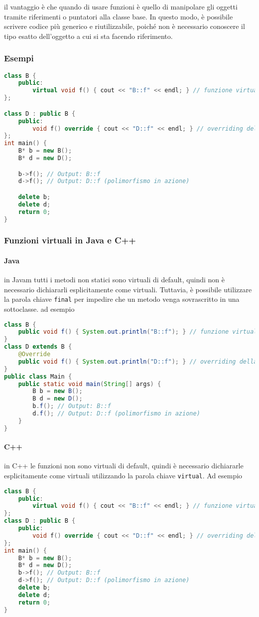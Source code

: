 \documentclass{report}
\begin{document}
il vantaggio è che quando di usare funzioni  è quello di manipolare gli oggetti tramite riferimenti o puntatori alla classe base. In questo modo, è possibile scrivere codice più generico e riutilizzabile, poiché non è necessario conoscere il tipo esatto dell'oggetto a cui si sta facendo riferimento.

\subsubsection{Esempi}

\begin{lstlisting}[language=C++]
class B {
    public:
        virtual void f() { cout << "B::f" << endl; } // funzione virtuale
};

class D : public B {
    public:
        void f() override { cout << "D::f" << endl; } // overriding della funzione virtuale
};
int main() {
    B* b = new B();
    B* d = new D();

    b->f(); // Output: B::f
    d->f(); // Output: D::f (polimorfismo in azione)

    delete b;
    delete d;
    return 0;
}
\end{lstlisting}

\subsubsection{Funzioni virtuali in Java e C++}
\paragraph{Java}
in Javam tutti i metodi non statici sono virtuali di default, quindi non è necessario dichiararli esplicitamente come virtuali. Tuttavia, è possibile utilizzare la parola chiave \texttt{final} per impedire che un metodo venga sovrascritto in una sottoclasse. ad esempio
\begin{lstlisting}[language=Java]
class B {
    public void f() { System.out.println("B::f"); } // funzione virtuale
}
class D extends B {
    @Override
    public void f() { System.out.println("D::f"); } // overriding della funzione virtuale
}
public class Main {
    public static void main(String[] args) {
        B b = new B();
        B d = new D();
        b.f(); // Output: B::f
        d.f(); // Output: D::f (polimorfismo in azione)
    }
}
\end{lstlisting}
\paragraph{C++}
in C++ le funzioni non sono virtuali di default, quindi è necessario dichiararle esplicitamente come virtuali utilizzando la parola chiave \texttt{virtual}. Ad esempio
\begin{lstlisting}[language=C++]
class B {
    public:
        virtual void f() { cout << "B::f" << endl; } // funzione virtuale
};  
class D : public B {
    public:
        void f() override { cout << "D::f" << endl; } // overriding della funzione virtuale
};
int main() {
    B* b = new B();
    B* d = new D();
    b->f(); // Output: B::f
    d->f(); // Output: D::f (polimorfismo in azione)
    delete b;
    delete d;
    return 0;
}
\end{lstlisting}
\end{document}
